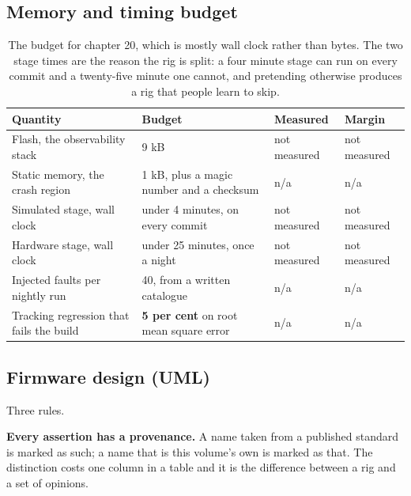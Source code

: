 \subsection*{Memory and timing budget}

\begin{table}[H]\centering\small
\begin{tabular}{p{44mm}p{28mm}p{28mm}p{30mm}}
\toprule
Quantity & Budget & Measured & Margin \\
\midrule
Flash, the observability stack & 9 kB & not measured & not measured \\
Static memory, the crash region & 1 kB, plus a magic number and a checksum & n/a & n/a \\
Simulated stage, wall clock & under 4 minutes, on every commit & not measured & not measured \\
Hardware stage, wall clock & under 25 minutes, once a night & not measured & not measured \\
Injected faults per nightly run & 40, from a written catalogue & n/a & n/a \\
Tracking regression that fails the build & \textbf{5 per cent} on root mean square error & n/a & n/a \\
\bottomrule
\end{tabular}
\caption{The budget for chapter 20, which is mostly wall clock rather than bytes. The two stage times are the reason the rig is split: a four minute stage can run on every commit and a twenty-five minute one cannot, and pretending otherwise produces a rig that people learn to skip.}
\end{table}

\subsection*{Firmware design (UML)}


Three rules.

\textbf{Every assertion has a provenance.} A name taken from a published
standard is marked as such; a name that is this volume's own is marked as that.
The distinction costs one column in a table and it is the difference between a
rig and a set of opinions.


